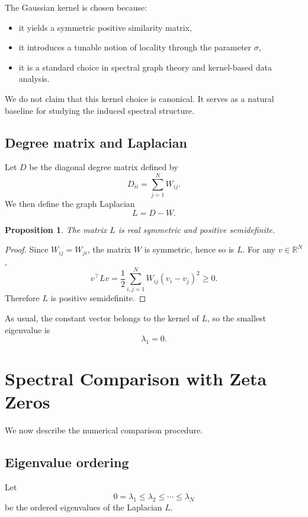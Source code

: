 \documentclass[11pt,a4paper]{article}
\newtheorem{proposition}[definition]{Proposition}
\newcommand{\R}{\mathbb{R}}
\begin{document}
	The Gaussian kernel is chosen because:
	\begin{itemize}
		\item it yields a symmetric positive similarity matrix,
		\item it introduces a tunable notion of locality through the parameter \(\sigma\),
		\item it is a standard choice in spectral graph theory and kernel-based data analysis.
	\end{itemize}
	
	We do not claim that this kernel choice is canonical. It serves as a natural baseline for studying the induced spectral structure.
	
	\subsection{Degree matrix and Laplacian}
	
	Let \(D\) be the diagonal degree matrix defined by
	\[
	D_{ii} = \sum_{j=1}^N W_{ij}.
	\]
	We then define the graph Laplacian
	\[
	L = D - W.
	\]
	
	\begin{proposition}
		The matrix \(L\) is real symmetric and positive semidefinite.
	\end{proposition}
	
	\begin{proof}
		Since \(W_{ij}=W_{ji}\), the matrix \(W\) is symmetric, hence so is \(L\). For any \(v\in\R^N\),
		\[
		v^\top L v
		=
		\frac12 \sum_{i,j=1}^N W_{ij}(v_i-v_j)^2 \ge 0.
		\]
		Therefore \(L\) is positive semidefinite.
	\end{proof}
	
	As usual, the constant vector belongs to the kernel of \(L\), so the smallest eigenvalue is
	\[
	\lambda_1=0.
	\]
	
	\section{Spectral Comparison with Zeta Zeros}
	
	We now describe the numerical comparison procedure.
	
	\subsection{Eigenvalue ordering}
	
	Let
	\[
	0=\lambda_1 \le \lambda_2 \le \cdots \le \lambda_N
	\]
	be the ordered eigenvalues of the Laplacian \(L\).
	
\end{document}
